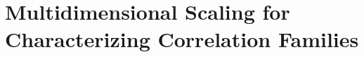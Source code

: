 \subsection{}



\section{Multidimensional Scaling for Characterizing Correlation Families}

\subsection{}

\subsection{}

\subsection{}

\subsection{}